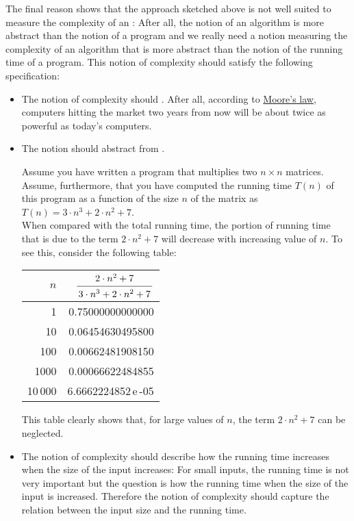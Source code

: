 The final reason shows that the approach sketched above is not well suited to measure the complexity of
an : After all, the notion of an algorithm is more abstract than the notion of a program
and we really need a notion measuring the complexity of an algorithm that is more abstract than the
notion of the running time of a program.  This notion of complexity should satisfy the following
specification: 
\begin{itemize}
\item The notion of complexity should .  After all, according to 
      \href{http://en.wikipedia.org/wiki/Moore's_law}{Moore's law}, 
      computers hitting the market two years from now will be about twice as powerful as today's computers.

\item The notion should abstract from .

      Assume you have written a program that  multiplies two $n \times n$ matrices.  Assume,
      furthermore, that you have computed the running time $T(n)$ of this program as a function 
      of the size $n$ of the matrix as
      \\[0.2cm]
      \hspace*{1.3cm} $T(n) = 3 \cdot n^3 + 2 \cdot n^2 + 7$. 
      \\[0.2cm]
      When compared with the total running time, the portion of running time that is due to the term 
      $2\cdot n^2 + 7$ will decrease with increasing value of $n$.  To see this, consider the
      following table:
      \\[0.3cm]
      \hspace*{1.3cm} 
      \begin{tabular}{|r|r|}
        \hline
        $n$  & \rule{0pt}{16pt} $\bruch{2 \cdot n^2 + 7}{3 \cdot n^3 + 2 \cdot n^2 + 7}$ \\[0.3cm]
        \hline
        \hline
        1       &  0.75000000000000  \\
        10      &  0.06454630495800  \\
        100     &  0.00662481908150  \\
        1000    &  0.00066622484855  \\
        10\,000 &  6.6662224852\,e\,-05  \\
       \hline
      \end{tabular}

      This table clearly shows that, for large values of $n$, the term $2 \cdot n^2 + 7$ can be
      neglected. 
\item The notion of complexity should describe how the running time increases
      when the size of the input increases:  For small inputs, the running time is not very
      important but the question is how the running time  when the size of the input is increased. 
      Therefore the notion of complexity should capture the relation between the input size and the running time.
\end{itemize}

